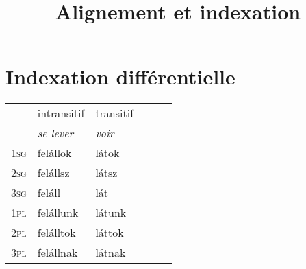\documentclass[oldfontcommands,twoside,a4paper,12pt]{article}
\newcommand{\ipa}[1]{{\phon\textbf{#1}}}
\begin{document}
\title{Alignement et indexation}
\maketitle
 

%
%
%
%
 \section{Indexation différentielle}
 \begin{table}[H] \centering
\begin{tabular}{llllll}
\toprule
& intransitif & transitif \\
&\textit{se lever} & \textit{voir} \\
\midrule
\textsc{1sg} & 	felállok	&	látok	\\	
\textsc{2sg} &	felállsz	&	látsz	\\	
\textsc{3sg} &	feláll	&	lát	\\	
\textsc{1pl} &	felállunk	&	látunk	\\	
\textsc{2pl} &	felálltok	&	láttok	\\	
\textsc{3pl} &	felállnak	&	látnak 	\\	
\bottomrule
\end{tabular} 
 \end{table} 
 
\end{document}
